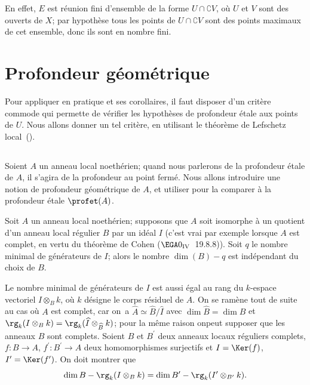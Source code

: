 En effet, $E$ est r\'eunion fini d'ensemble de la forme $U\cap\complement V$, o\`u $U$ et $V$ sont des ouverts de $X$; par hypoth\`ese tous les points de $U\cap\complement V$ sont des points maximaux de cet ensemble, donc ils sont en nombre fini.

\section{Profondeur g\'eom\'etrique} \label{XIV.5}

Pour appliquer en pratique  et ses corollaires, il faut disposer d'un crit\`ere commode qui permette de v\'erifier les hypoth\`eses de profondeur \'etale aux points de $U$. Nous allons donner un tel crit\`ere, en utilisant le th\'eor\`eme de Lefschetz local~().

\subsection{} \label{XIV.5.1} Soient $A$ un anneau local noeth\'erien; quand nous parlerons de la profondeur \'etale de $A$, il s'agira de la profondeur au point ferm\'e. Nous allons introduire une notion de \og profondeur g\'eom\'etrique de $A$\fg, et utiliser  pour la comparer \`a la profondeur \'etale $\profet(A)$.

\begin{proposition} \label{XIV.5.2} Soit $A$ un anneau local noeth\'erien; supposons que $A$ soit isomorphe \`a un quotient d'un anneau local r\'egulier $B$ par un id\'eal $I$ (c'est vrai par exemple lorsque $A$ est complet, en vertu du th\'eor\`eme de Cohen (\textup{$\EGA 0_{\textup{IV}}$~19.8.8})). Soit $q$ le nombre minimal de g\'en\'erateurs de $I$; alors le nombre $\dim(B)-q$ est ind\'ependant du choix de $B$.
\end{proposition}

Le nombre minimal de g\'en\'erateurs de $I$ est aussi \'egal au rang du $k$-espace vectoriel $I\otimes_{B}k$, o\`u $k$ d\'esigne le corps r\'esiduel de $A$. On se ram\`ene tout de suite au cas o\`u $A$ est complet, car on~a $\widehat{A}\simeq\widehat{B}/\widehat{I}$ avec $\dim \widehat{B}=\dim B$ et $\rg_{k}(I\otimes_{B}k)=\rg_{k}(\widehat{I}\otimes_{\widehat{B}}k)$; pour la m\^eme raison on\pageoriginale peut supposer que les anneaux $B$ sont complets. Soient $B$ et $B^{\prime}$ deux anneaux locaux r\'eguliers complets, $f\colon B\to A$, $f^{\prime}\colon B^{\prime}\to A$ deux homomorphismes surjectifs et $I=\Ker(f)$, $I^{\prime}=\Ker(f^{\prime})$. On doit montrer que
$$
\dim B-\rg_{k}(I\otimes_{B}k)=\dim B^{\prime}-\rg_{k}(I^{\prime}\otimes_{B^{\prime}}k).
$$

